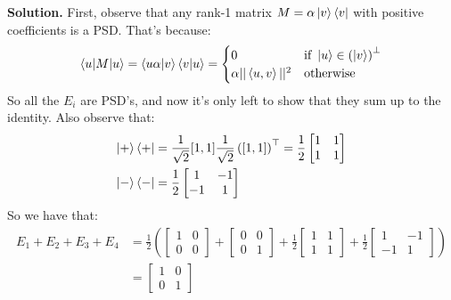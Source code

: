\documentclass[12pt,a4paper]{article}
\begin{document}
\begin{enumerate}
    
    \textbf{Solution.} First, observe that any rank-1 matrix $M=\alpha\ket{v}\bra{v}$ with positive coefficients is a PSD. That's because:
    \begin{equation*}
     \braket{u|M|u} = \braket{u\alpha|v}\braket{v|u} = \begin{cases}
			0 & \text{if\ } \ket{u} \in \left( \ket{v} \right)^\perp \\
            \alpha ||\braket{u,v}||^2  & \text{otherwise}
		 \end{cases}   
    \end{equation*}
    So all the $E_i$ are PSD's, and now it's only left to show that they sum up to the identity. Also observe that: 
    \begin{equation*}
    \begin{split}
    \ket{+}\bra{+} &= \frac{1}{\sqrt{2}}[1 , 1]  \frac{1}{\sqrt{2}} \left([ 1 , 1 ]\right)^\top = \frac{1}{2}\begin{bmatrix}
        1 & 1 \\
        1 & 1
    \end{bmatrix} \\ 
    \ket{-}\bra{-} &= \frac{1}{2}\begin{bmatrix}
        1 & -1 \\
        -1 & 1
    \end{bmatrix}
    \end{split}
    \end{equation*}
     So we have that:
    \begin{equation*}
    \begin{split}
        E_{1} + E_{2} + E_{3} + E_{4} &= \frac{1}{2}\left( \begin{bmatrix}
        1 & 0 \\
        0 & 0
    \end{bmatrix} + \begin{bmatrix}
        0 & 0 \\
        0 & 1
    \end{bmatrix} + \frac{1}{2}\begin{bmatrix}
        1 & 1 \\
        1 & 1
    \end{bmatrix} + \frac{1}{2}\begin{bmatrix}
        1 & -1 \\
        -1 & 1
    \end{bmatrix} \right)        
    \\ &= \begin{bmatrix}
        1 & 0 \\
        0 & 1
    \end{bmatrix} 
    \end{split}
    \end{equation*}


\end{enumerate}
\end{document}
